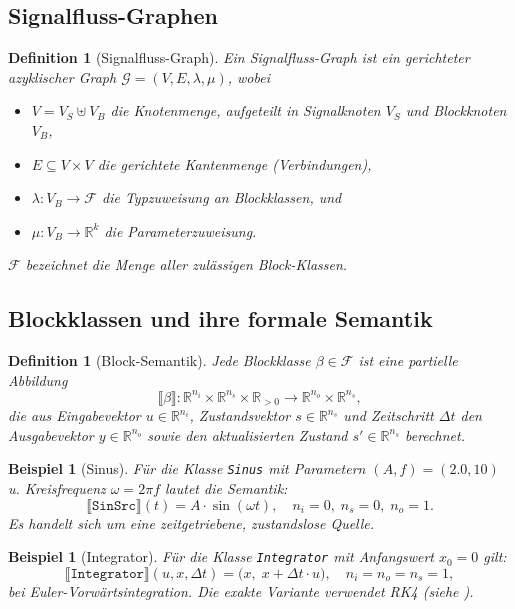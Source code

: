 ﻿\documentclass[12pt,a4paper]{article}
\newtheorem{definition}[theorem]{Definition}
\newtheorem{beispiel}[theorem]{Beispiel}
\theoremstyle{definition}
\begin{document}
\subsection{Signalfluss-Graphen}

\begin{definition}[Signalfluss-Graph]
\label{def:sfg}
Ein \emph{Signalfluss-Graph} ist ein gerichteter azyklischer Graph
$\mathcal{G} = (V, E, \lambda, \mu)$, wobei
\begin{itemize}[nosep]
  \item $V = V_S \uplus V_B$ die Knotenmenge, aufgeteilt in Signalknoten $V_S$
        und Blockknoten $V_B$,
  \item $E \subseteq V \times V$ die gerichtete Kantenmenge (Verbindungen),
  \item $\lambda : V_B \to \mathcal{F}$ die Typzuweisung an Blockklassen, und
  \item $\mu : V_B \to \mathbb{R}^k$ die Parameterzuweisung.
\end{itemize}
$\mathcal{F}$ bezeichnet die Menge aller zulässigen Block-Klassen.
\end{definition}

\subsection{Blockklassen und ihre formale Semantik}

\begin{definition}[Block-Semantik]
\label{def:blocksem}
Jede Blockklasse $\beta \in \mathcal{F}$ ist eine partielle Abbildung
\[
  \llbracket \beta \rrbracket : \mathbb{R}^{n_i} \times \mathbb{R}^{n_s} \times \mathbb{R}_{>0}
  \longrightarrow \mathbb{R}^{n_o} \times \mathbb{R}^{n_s},
\]
die aus Eingabevektor $u \in \mathbb{R}^{n_i}$, Zustandsvektor $s \in \mathbb{R}^{n_s}$
und Zeitschritt $\Delta t$ den Ausgabevektor $y \in \mathbb{R}^{n_o}$ sowie den
aktualisierten Zustand $s' \in \mathbb{R}^{n_s}$ berechnet.
\end{definition}

\begin{beispiel}[Sinus]
Für die Klasse \texttt{Sinus} mit Parametern $(A, f) = (2.0, 10)$
u. Kreisfrequenz $\omega = 2\pi f$ lautet die Semantik:
\[
  \llbracket \texttt{SinSrc} \rrbracket(t) = A \cdot \sin(\omega t),\quad n_i = 0,\; n_s = 0,\; n_o = 1.
\]
Es handelt sich um eine zeitgetriebene, zustandslose Quelle.
\end{beispiel}

\begin{beispiel}[Integrator]
Für die Klasse \texttt{Integrator} mit Anfangswert $x_0 = 0$ gilt:
\[
  \llbracket \texttt{Integrator} \rrbracket(u, x, \Delta t) =
  \bigl(x,\; x + \Delta t \cdot u\bigr),\quad n_i = n_o = n_s = 1,
\]
bei Euler-Vorwärtsintegration. Die exakte Variante verwendet RK4 (siehe ).
\end{beispiel}
\end{document}
